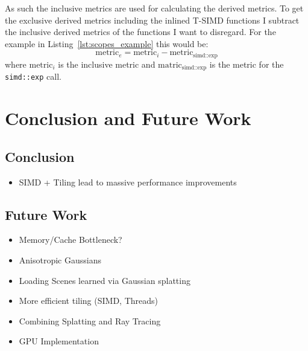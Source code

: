\documentclass[a4paper, 11pt]{memoir}
\begin{document}
    As such the inclusive metrics are used for calculating the derived metrics. To get the exclusive derived metrics including the inlined T-SIMD functions I subtract
    the inclusive derived metrics of the functions I want to disregard. For the example in Listing~\ref{lst:scopes_example}
    this would be:
    \[ \text{metric}_e = \text{metric}_i - \text{metric}_{\text{simd::exp}} \]
    where $\text{metric}_i$ is the inclusive metric and $\text{matric}_{\text{simd::exp}}$ is the metric for the \texttt{simd::exp} call.


    \chapter{Conclusion and Future Work}
    \section{Conclusion}
    \begin{itemize}
        \item SIMD + Tiling lead to massive performance improvements
    \end{itemize}

    \section{Future Work}
    \begin{itemize}
        \item Memory/Cache Bottleneck?
        \item Anisotropic Gaussians
        \item Loading Scenes learned via Gaussian splatting
        \item More efficient tiling (SIMD, Threads)
        \item Combining Splatting and Ray Tracing
        \item GPU Implementation
    \end{itemize}
\end{document}
